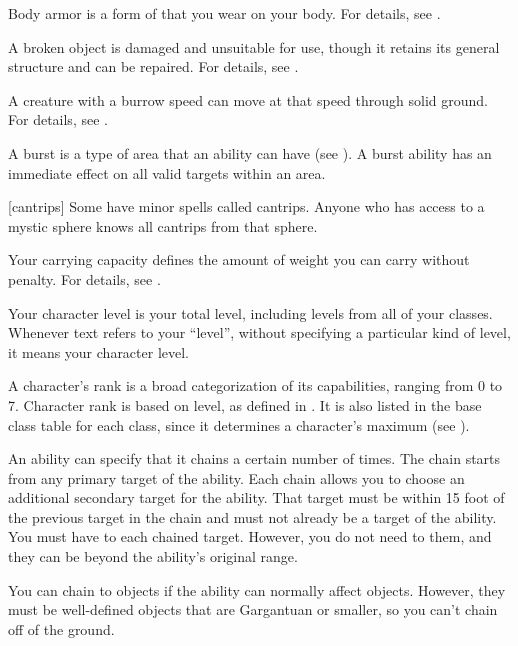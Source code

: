  Body armor is a form of  that you wear on your body.
For details, see .

 A broken object is damaged and unsuitable for use, though it retains its general structure and can be repaired.
For details, see .

 A creature with a burrow speed can move at that speed through solid ground.
For details, see .

 A burst is a type of area that an ability can have (see ).
A burst ability has an immediate effect on all valid targets within an area.

[cantrips] Some  have minor spells called cantrips.
Anyone who has access to a mystic sphere knows all cantrips from that sphere.

 Your carrying capacity defines the amount of weight you can carry without penalty.
For details, see .

 Your character level is your total level, including levels from all of your classes.
Whenever text refers to your ``level'', without specifying a particular kind of level, it means your character level.

 A character's rank is a broad categorization of its capabilities, ranging from 0 to 7.
Character rank is based on level, as defined in .
It is also listed in the base class table for each class, since it determines a character's maximum  (see ).

 An ability can specify that it chains a certain number of times.
The chain starts from any primary target of the ability.
Each chain allows you to choose an additional secondary target for the ability.
That target must be within 15 foot  of the previous target in the chain and must not already be a target of the ability.
You must have  to each chained target.
However, you do not need  to them, and they can be beyond the ability's original range.

You can chain to objects if the ability can normally affect objects.
However, they must be well-defined objects that are Gargantuan or smaller, so you can't chain off of the ground.

